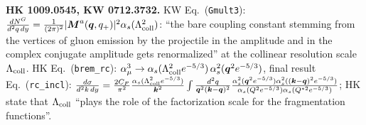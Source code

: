 \noindent\textbf{HK 1009.0545, KW 0712.3732.} KW Eq.~(\texttt{Gmult3}): $\frac{dN^{G}}{d^{2}q\,dy}=\frac{1}{(2\pi)^{2}}|\boldsymbol M^{a}(\boldsymbol q,q_{+})|^{2}\alpha_{s}(\Lambda_{\rm coll}^{2})$: ``the bare coupling constant stemming from the vertices of gluon emission by the projectile in the amplitude and in the complex conjugate amplitude gets renormalized'' at the collinear resolution scale $\Lambda_{\rm coll}$. HK Eq.~(\texttt{brem\_rc}): $\alpha_{\mu}^{3}\to\alpha_{s}(\Lambda^{2}_{\rm coll}e^{-5/3})\,\alpha_{s}^{2}(\boldsymbol q^{2}e^{-5/3})$, final result Eq.~(\texttt{rc\_incl}): $\frac{d\sigma}{d^{2}k\,dy}=\frac{2C_{F}}{\pi^{2}}\frac{\alpha_{s}(\Lambda_{\rm coll}^{2}e^{-5/3})}{\boldsymbol k^{2}}\int\frac{d^{2}q}{\boldsymbol q^{2}(\boldsymbol k-\boldsymbol q)^{2}}\frac{\alpha_{s}^{2}(\boldsymbol q^{2}e^{-5/3})\alpha_{s}^{2}((\boldsymbol k-\boldsymbol q)^{2}e^{-5/3})}{\alpha_{s}(Q^{2}e^{-5/3})\alpha_{s}(Q^{*2}e^{-5/3})}$; HK state that $\Lambda_{\rm coll}$ ``plays the role of the factorization scale for the fragmentation functions''.
